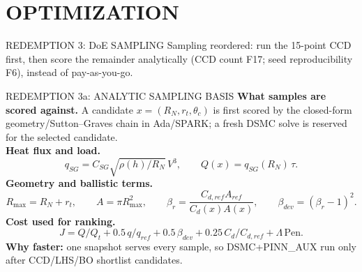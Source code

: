\documentclass[aspectratio=169,11pt]{beamer}
\begin{document}
\section{OPTIMIZATION}

\begin{frame}{REDEMPTION 3: DoE SAMPLING}
  Sampling reordered: run the 15-point CCD first, then score the remainder analytically
  (CCD count F17; seed reproducibility F6), instead of pay-as-you-go.
\end{frame}
\begin{frame}{REDEMPTION 3a: ANALYTIC SAMPLING BASIS}
  \small
  \textbf{What samples are scored against.} A candidate
  $x=(R_N,r_t,\theta_c)$ is first scored by the closed-form geometry/Sutton--Graves
  chain in Ada/SPARK; a fresh DSMC solve is reserved for the selected candidate.\\
  \textbf{Heat flux and load.}
  \[
    q_{SG}=C_{SG}\sqrt{\rho(h)/R_N}\,V^3,
    \qquad
    Q(x)=q_{SG}(R_N)\,\tau .
  \]
  \textbf{Geometry and ballistic terms.}
  \[
    R_{\max}=R_N+r_t,\qquad
    A=\pi R_{\max}^2,\qquad
    \beta_r=\frac{C_{d,ref}A_{ref}}{C_d(x)A(x)},\qquad
    \beta_{dev}=(\beta_r-1)^2 .
  \]
  \textbf{Cost used for ranking.}
  \[
    J=Q/Q_t+0.5\,q/q_{ref}+0.5\,\beta_{dev}
      +0.25\,C_d/C_{d,ref}+\Lambda\,\mathrm{Pen}.
  \]
  \textbf{Why faster:} one snapshot serves every sample, so DSMC+PINN\_AUX run only
  after CCD/LHS/BO shortlist candidates.
\end{frame}
\end{document}
